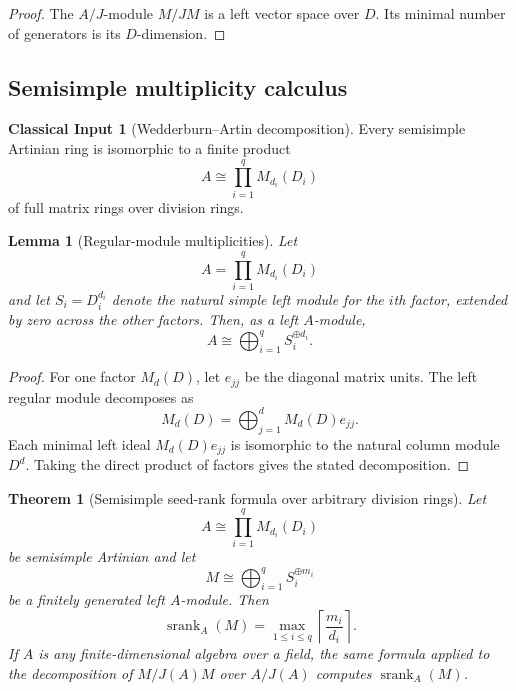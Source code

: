 \documentclass[11pt]{article}
\newtheorem{theorem}{Theorem}[section]
\newtheorem{lemma}[lemma]{Lemma}
\theoremstyle{definition}
\newtheorem{classicalinput}[classicalinput]{Classical Input}
\theoremstyle{remark}
\theoremstyle{definition}\newtheorem{example}[theorem]{Example}
\newcommand{\srank}{\operatorname{srank}}
\newcommand{\RecordID}[1]{\label{record:#1}}
\newcommand{\Depends}[1]{}
\newcommand{\Exports}[1]{}
\begin{document}
\begin{proof}
The $A/J$-module $M/JM$ is a left vector space over $D$.  Its minimal number of generators is its $D$-dimension.
\end{proof}

\subsection{Semisimple multiplicity calculus}
\begin{classicalinput}[Wedderburn--Artin decomposition]
\label{ci:wedderburn}
Every semisimple Artinian ring is isomorphic to a finite product
\[
A\cong\prod_{i=1}^{q}M_{d_i}(D_i)
\]
of full matrix rings over division rings.
\end{classicalinput}
\RecordID{PSC-I-CI-WEDDERBURN-ARTIN}

\begin{lemma}[Regular-module multiplicities]
\label{lem:regular-multiplicities}
Let
\[
A=\prod_{i=1}^{q}M_{d_i}(D_i)
\]
and let $S_i=D_i^{d_i}$ denote the natural simple left module for the $i$th factor, extended by zero across the other factors.  Then, as a left $A$-module,
\[
\boxed{A\cong\bigoplus_{i=1}^{q}S_i^{\oplus d_i}.}
\]
\end{lemma}
\RecordID{PSC-I-L-REGULAR-MODULE-MULTIPLICITIES}
\Depends{PSC-I-CI-WEDDERBURN-ARTIN.}

\begin{proof}
For one factor $M_d(D)$, let $e_{jj}$ be the diagonal matrix units.  The left regular module decomposes as
\[
M_d(D)=\bigoplus_{j=1}^{d}M_d(D)e_{jj}.
\]
Each minimal left ideal $M_d(D)e_{jj}$ is isomorphic to the natural column module $D^d$.  Taking the direct product of factors gives the stated decomposition.
\end{proof}

\begin{theorem}[Semisimple seed-rank formula over arbitrary division rings]
\label{thm:semisimple-seed-rank}
Let
\[
A\cong\prod_{i=1}^{q}M_{d_i}(D_i)
\]
be semisimple Artinian and let
\[
M\cong\bigoplus_{i=1}^{q}S_i^{\oplus m_i}
\]
be a finitely generated left $A$-module.  Then
\[
\boxed{
\srank_A(M)
=
\max_{1\leq i\leq q}
\left\lceil\frac{m_i}{d_i}\right\rceil.
}
\]
If $A$ is any finite-dimensional algebra over a field, the same formula applied to the decomposition of $M/J(A)M$ over $A/J(A)$ computes $\srank_A(M)$.
\end{theorem}
\RecordID{PSC-I-T-SEMISIMPLE-SEED-RANK}
\Depends{PSC-I-T-MODULE-TOP, PSC-I-CI-WEDDERBURN-ARTIN, PSC-I-L-REGULAR-MODULE-MULTIPLICITIES, and PSC-I-C-MINIMAL-FREE-COVER.}
\Exports{Every finite-dimensional semisimple seed-rank calculation in the series.}
\end{document}
